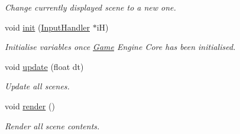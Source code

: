 \begin{DoxyCompactItemize}
\begin{DoxyCompactList}\small\item\em Change currently displayed scene to a new one. \end{DoxyCompactList}\item 
\hypertarget{class_game_a80a97d5ea17819259d4e537433f19906}{void \hyperlink{class_game_a80a97d5ea17819259d4e537433f19906}{init} (\hyperlink{class_input_handler}{Input\+Handler} $\ast$i\+H)}\label{class_game_a80a97d5ea17819259d4e537433f19906}

\begin{DoxyCompactList}\small\item\em Initialise variables once \hyperlink{class_game}{Game} Engine Core has been initialised. \end{DoxyCompactList}\item 
\hypertarget{class_game_a2648dc91da0dd1424d5b7c45510515a0}{void \hyperlink{class_game_a2648dc91da0dd1424d5b7c45510515a0}{update} (float dt)}\label{class_game_a2648dc91da0dd1424d5b7c45510515a0}

\begin{DoxyCompactList}\small\item\em Update all scenes. \end{DoxyCompactList}\item 
\hypertarget{class_game_a15ddd769261d923827a3cdf41499c843}{void \hyperlink{class_game_a15ddd769261d923827a3cdf41499c843}{render} ()}\label{class_game_a15ddd769261d923827a3cdf41499c843}

\begin{DoxyCompactList}\small\item\em Render all scene contents. \end{DoxyCompactList}\end{DoxyCompactItemize}
